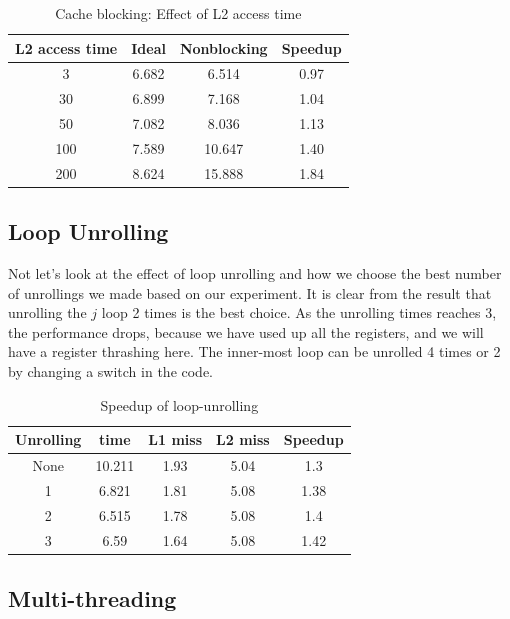 \documentclass[twocolumn,letterpaper,10pt]{article}
\begin{document}
\begin{table}[ht!]
\begin{center}
\begin{tabular}{cccc}
\toprule
L2 access time & Ideal	& Nonblocking & Speedup\\
\midrule
3 &	6.682 & 6.514 & 0.97 \\ 
30 & 6.899  & 7.168 & 1.04 \\ 
50	& 7.082	& 8.036 & 1.13  \\ 
100	& 7.589	& 10.647 & 1.40 \\ 
200	& 8.624	& 15.888 & 1.84\\
\bottomrule
\end{tabular}
\end{center}
\caption{Cache blocking: Effect of L2 access time}
\end{table}


\subsection{Loop Unrolling}

Not let's look at the effect of loop unrolling and how we choose the
best number of unrollings we made based on our experiment. It is clear
from the result that unrolling the $j$ loop 2 times is the best
choice. As the unrolling times reaches 3, the performance drops,
because we have used up all the registers, and we will have a register
thrashing here. The inner-most loop can be unrolled 4 times or 2 by
changing a switch in the code.

\begin{table}[ht!]
\begin{center}
\begin{tabular}{ccccc}
\toprule
Unrolling & time & L1 miss  & L2 miss & Speedup \\
\midrule
None & 10.211 & 1.93 & 5.04	& 1.3 \\
1 & 6.821 & 1.81 & 5.08 & 1.38 \\
2 & 6.515 & 1.78 & 5.08 & 1.4 \\
3 &	6.59 & 1.64	& 5.08 & 1.42 \\
\bottomrule
\end{tabular}
\end{center}
\caption{Speedup of loop-unrolling}
\label{fig:unrolling}
\end{table}


\subsection{Multi-threading}
\end{document}

